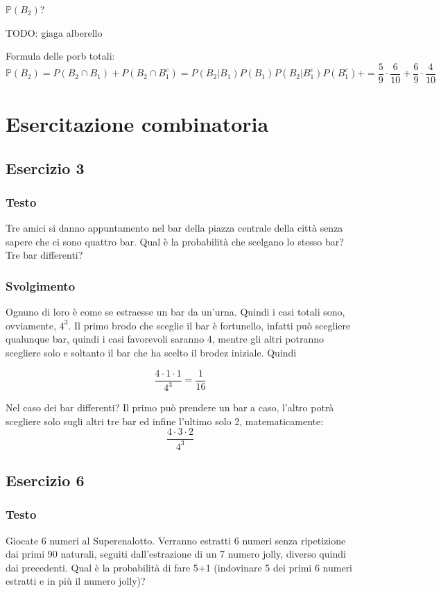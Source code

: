 $\mathbb{P}(B_2)$?

TODO: giaga alberello

Formula delle porb totali:
\[
    \mathbb{P}(B_2) = P(B_2 \cap B_1) + P(B_2\cap B_1^c )= P(B_2| B_1)P (B_1)  P(B_2| B_1^c)P (B_1^c) +  = \frac{5}{9}\cdot \frac{6}{10}+\frac{6}{9}\cdot\frac{4}{10}
\]
\section{Esercitazione combinatoria}
\subsection{Esercizio 3}

\subsubsection{Testo}
Tre amici si danno appuntamento nel bar della piazza centrale della città senza sapere che ci sono quattro bar. Qual è la probabilità che scelgano lo stesso bar? Tre bar differenti?

\subsubsection{Svolgimento}
Ognuno di loro è come se estraesse un bar da un'urna. Quindi i casi totali sono, ovviamente, $4^3$. Il primo brodo che sceglie il bar è fortunello, infatti può scegliere qualunque bar, quindi i casi favorevoli saranno 4, mentre gli altri potranno scegliere solo e soltanto il bar che ha scelto il brodez iniziale. Quindi

\[
  \frac{4\cdot 1\cdot 1}{4^3} = \frac{1}{16}
\]

Nel caso dei bar differenti? Il primo può prendere un bar a caso, l'altro potrà scegliere solo sugli altri tre bar ed infine l'ultimo solo 2, matematicamente:
\[
  \frac{4\cdot 3\cdot 2}{4^3}
\]

\subsection{Esercizio 6}

\subsubsection{Testo}
Giocate 6 numeri al Superenalotto. Verranno estratti 6 numeri senza ripetizione dai primi 90 naturali, seguiti dall'estrazione di un 7 numero jolly, diverso quindi dai precedenti. Qual è la probabilità di fare 5+1 (indovinare 5 dei primi 6 numeri estratti e in più il numero jolly)?

